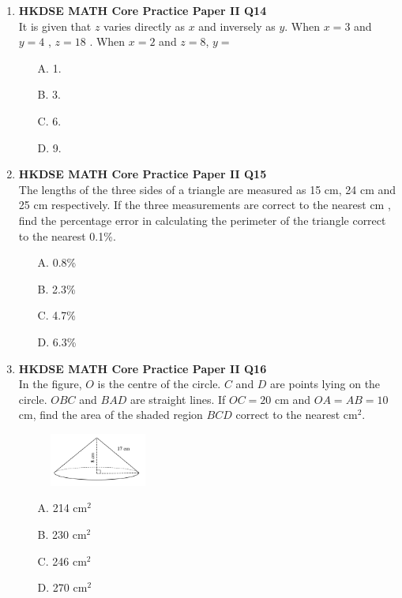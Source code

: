 \documentclass[12pt]{article}
\begin{document}
\begin{enumerate}
	\item \textbf{HKDSE MATH Core Practice Paper II Q14}\\
	It is given that $z$ varies directly as $x$ and inversely as $y$. When $x = 3$ and $y = 4$ , $z = 18$ . When $x = 2$ and $z = 8$, $y = $
	\begin{enumerate}
		\item[A.] 1.
		\item[B.] 3.
		\item[C.] 6.
		\item[D.] 9.
	\end{enumerate}

	\item \textbf{HKDSE MATH Core Practice Paper II Q15}\\
	The lengths of the three sides of a triangle are measured as 15 cm, 24 cm and 25 cm respectively. If the three measurements are correct to the nearest cm , find the percentage error in calculating the perimeter of the triangle correct to the nearest 0.1\%.
	\begin{enumerate}
		\item[A.] 0.8\%
		\item[B.] 2.3\%
		\item[C.] 4.7\%
		\item[D.] 6.3\%
	\end{enumerate}

	\item \textbf{HKDSE MATH Core Practice Paper II Q16}\\
	In the figure, $O$ is the centre of the circle. $C$ and $D$ are points lying on the circle. $OBC$ and $BAD$ are straight lines. If $OC = 20$ cm and $OA = AB = 10$ cm, find the area of the shaded region $BCD$ correct to the nearest cm$^2$.
	\begin{figure}[h]
		\centering
		\includegraphics[width = 0.3\textwidth]{PPFigure2.16.png}	
	\end{figure}
	\begin{enumerate}
		\item[A.] 214 cm$^2$
		\item[B.] 230 cm$^2$
		\item[C.] 246 cm$^2$
		\item[D.] 270 cm$^2$
	\end{enumerate}


\end{enumerate}
\end{document}
